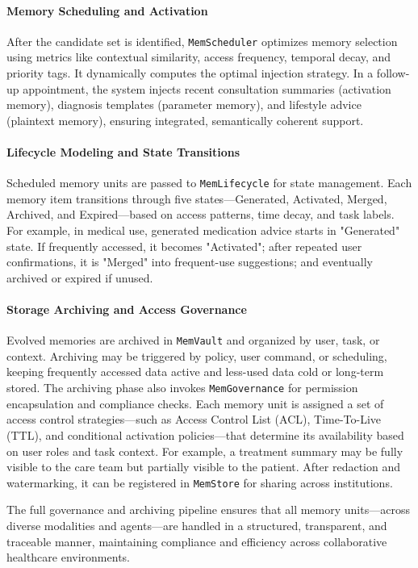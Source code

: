 \documentclass[]{memtensor}
\begin{document}
\paragraph{\textbf{Memory Scheduling and Activation}}
After the candidate set is identified, \texttt{MemScheduler} optimizes memory selection using metrics like contextual similarity, access frequency, temporal decay, and priority tags. It dynamically computes the optimal injection strategy.
In a follow-up appointment, the system injects recent consultation summaries (activation memory), diagnosis templates (parameter memory), and lifestyle advice (plaintext memory), ensuring integrated, semantically coherent support.

\paragraph{\textbf{Lifecycle Modeling and State Transitions}}
Scheduled memory units are passed to \texttt{MemLifecycle} for state management. Each memory item transitions through five states—Generated, Activated, Merged, Archived, and Expired—based on access patterns, time decay, and task labels.
For example, in medical use, generated medication advice starts in "Generated" state. If frequently accessed, it becomes "Activated"; after repeated user confirmations, it is "Merged" into frequent-use suggestions; and eventually archived or expired if unused.

\paragraph{\textbf{Storage Archiving and Access Governance}} 
Evolved memories are archived in \texttt{MemVault} and organized by user, task, or context. Archiving may be triggered by policy, user command, or scheduling, keeping frequently accessed data active and less-used data cold or long-term stored.
The archiving phase also invokes \texttt{MemGovernance} for permission encapsulation and compliance checks. Each memory unit is assigned a set of access control strategies—such as Access Control List (ACL), Time-To-Live (TTL), and conditional activation policies—that determine its availability based on user roles and task context.
For example, a treatment summary may be fully visible to the care team but partially visible to the patient. After redaction and watermarking, it can be registered in \texttt{MemStore} for sharing across institutions.

The full governance and archiving pipeline ensures that all memory units—across diverse modalities and agents—are handled in a structured, transparent, and traceable manner, maintaining compliance and efficiency across collaborative healthcare environments.
\end{document}
